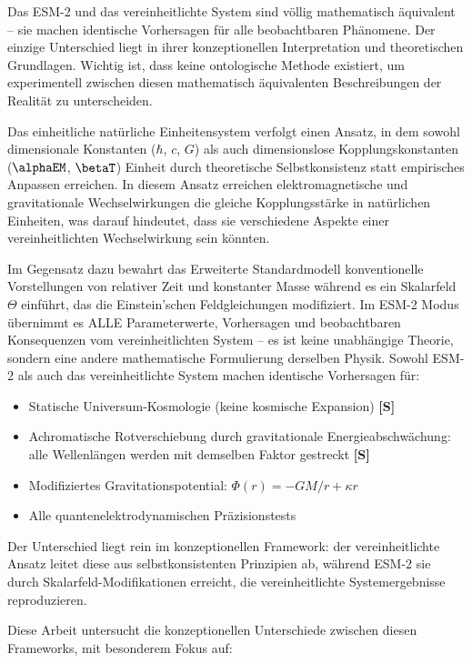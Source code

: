 	Das ESM-2 und das vereinheitlichte System sind völlig mathematisch äquivalent – sie machen identische Vorhersagen für alle beobachtbaren Phänomene. Der einzige Unterschied liegt in ihrer konzeptionellen Interpretation und theoretischen Grundlagen. Wichtig ist, dass keine ontologische Methode existiert, um experimentell zwischen diesen mathematisch äquivalenten Beschreibungen der Realität zu unterscheiden.
	
	Das einheitliche natürliche Einheitensystem verfolgt einen Ansatz, in dem sowohl dimensionale Konstanten ($\hbar$, $c$, $G$) als auch dimensionslose Kopplungskonstanten ($\alphaEM$, $\betaT$) Einheit durch theoretische Selbstkonsistenz statt empirisches Anpassen erreichen. In diesem Ansatz erreichen elektromagnetische und gravitationale Wechselwirkungen die gleiche Kopplungsstärke in natürlichen Einheiten, was darauf hindeutet, dass sie verschiedene Aspekte einer vereinheitlichten Wechselwirkung sein könnten.
	
	Im Gegensatz dazu bewahrt das Erweiterte Standardmodell konventionelle Vorstellungen von relativer Zeit und konstanter Masse während es ein Skalarfeld $\Theta$ einführt, das die Einstein'schen Feldgleichungen modifiziert. Im ESM-2 Modus übernimmt es ALLE Parameterwerte, Vorhersagen und beobachtbaren Konsequenzen vom vereinheitlichten System – es ist keine unabhängige Theorie, sondern eine andere mathematische Formulierung derselben Physik. Sowohl ESM-2 als auch das vereinheitlichte System machen identische Vorhersagen für:
	
	\begin{itemize}
		\item Statische Universum-Kosmologie (keine kosmische Expansion) \textbf{[S]}
		\item Achromatische Rotverschiebung durch gravitationale Energieabschwächung: alle Wellenlängen werden mit demselben Faktor gestreckt \textbf{[S]}
		\item Modifiziertes Gravitationspotential: $\Phi(r) = -GM/r + \kappa r$
		\item Alle quantenelektrodynamischen Präzisionstests
	\end{itemize}
	
	Der Unterschied liegt rein im konzeptionellen Framework: der vereinheitlichte Ansatz leitet diese aus selbstkonsistenten Prinzipien ab, während ESM-2 sie durch Skalarfeld-Modifikationen erreicht, die vereinheitlichte Systemergebnisse reproduzieren.
	
	Diese Arbeit untersucht die konzeptionellen Unterschiede zwischen diesen Frameworks, mit besonderem Fokus auf:
	
